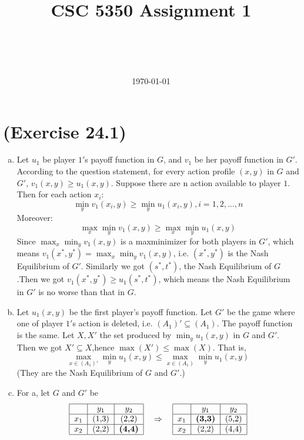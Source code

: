\def\CTeXPreproc{Created by ctex v0.2.12, don't edit!}\documentclass[a4paper,12pt]{article}
\title{CSC 5350 Assignment 1}
\author{\myname\\\mymail\\\CSE\\\CUHK}
\date{\today}
\newcommand{\NE}{Nash Equilibrium }
\begin{document}
\maketitle

\section{(Exercise 24.1)}

\begin{enumerate}[a.]
\item
Let $u_{1}$ be player $1'$s payoff function in $G$, and $v_{1}$ be
her payoff function in $G'$. According to the question statement,
for every action profile $(x,y)$ in $G$ and $G'$, $v_{1}(x,y)\geq
u_{1}(x,y)$. Suppose there are n action available to player $1$.
Then for each action $x_{i}$:
\begin{equation}\min_{y}v_{1}(x_{i},y)\geq \min_{y}u_{1}(x_{i},y) ,
i=1,2,\ldots,n
\end{equation}
Moreover:
\begin{equation}
\max_{x}\min_{y}v_{1}(x,y)\geq \max_{x}\min_{y}u_{1}(x,y)
\end{equation}
Since $\max_{x}\min_{y}v_{1}(x,y)$ is a maxminimizer for both
players in $G'$, which means
$v_{1}(x^*,y^*)=\max_{x}\min_{y}v_{1}(x,y)$, i.e. $(x^*,y^*)$ is the
\NE of $G'$. Similarly we got $(s^*,t^*)$, the \NE of $G$.Then we
got $v_1(x^*,y^*)\geq u_1(s^*,t^*)$, which means the Nash
Equilibrium in $G'$ is no worse than that in $G$.

\item
Let $u_1(x,y)$ be the first player's payoff function. Let $G'$ be
the game where one of player $1'$s action is deleted, i.e.
$(A_1)'\subseteq (A_1)$. The payoff function is the same. Let $X,X'$
the set produced by $\min_yu_1(x,y)$ in $G$ and $G'$. Then we got
$X'\subseteq X$,hence $\max(X')\leq \max(X)$. That is,
\begin{equation}
\max_{x\in (A_1)'}\min_yu_1(x,y)\leq \max_{x\in
(A_1)}\min_yu_1(x,y)\end{equation} (They are the \NE of $G$ and
$G'$.)

\item
For a, let $G$ and $G'$ be \\
\[
\begin{tabular}{|c|c|c|}
  \hline
        & $y_1$ & $y_2$ \\
  \hline
  $x_1$ & (1,3) & (2,2) \\
  \hline
  $x_2$ & (2,2) & \textbf{(4,4)} \\
  \hline
\end{tabular}
\quad \Rightarrow \quad
\begin{tabular}{|c|c|c|}
  \hline
        & $y_1$ & $y_2$ \\
  \hline
  $x_1$ & \textbf{(3,3)} & (5,2) \\
  \hline
  $x_2$ & (2,2) & (4,4) \\
  \hline
\end{tabular}
\]


\end{enumerate}
\end{document}
